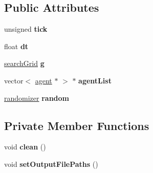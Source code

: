 \subsection*{Public Attributes}
\begin{DoxyCompactItemize}
\item 
\mbox{\label{classmodel_a98fc532cc6ca8ec05f9ca7885f8310a6}} 
unsigned {\bfseries tick}
\item 
\mbox{\label{classmodel_acea5467698b2a0bf754cb2680e292959}} 
float {\bfseries dt}
\item 
\mbox{\label{classmodel_ae2282007872b337492343762def0693c}} 
\mbox{\hyperlink{classsearchGrid}{search\+Grid}} {\bfseries g}
\item 
\mbox{\label{classmodel_a72a2d5ccc0f9248e52e5baada92f3c65}} 
vector$<$ \mbox{\hyperlink{classagent}{agent}} $\ast$ $>$ $\ast$ {\bfseries agent\+List}
\item 
\mbox{\label{classmodel_a83b015b77324bc70fb2a74ef90885291}} 
\mbox{\hyperlink{classrandomizer}{randomizer}} {\bfseries random}
\end{DoxyCompactItemize}
\subsection*{Private Member Functions}
\begin{DoxyCompactItemize}
\item 
\mbox{\label{classmodel_aa82375be2bd53080d3a5e3fcfa0df30c}} 
void {\bfseries clean} ()
\item 
\mbox{\label{classmodel_af6e1bf4eb735c76eb9f77a10b0a64ff8}} 
void {\bfseries set\+Output\+File\+Paths} ()
\end{DoxyCompactItemize}
